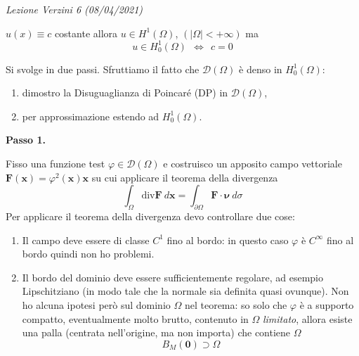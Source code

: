 \documentclass[10pt,a4paper,twoside,openright]{book}
\begin{document}
\textit{Lezione Verzini 6 (08/04/2021)}
\begin{oss}
	$\displaystyle u( x) \equiv c$ costante allora $\displaystyle u\in H^{1}( \Omega )$, $\displaystyle ( |\Omega |< +\infty )$ ma
	\begin{equation*}
		u\in H_{0}^{1}( \Omega ) \ \ \Leftrightarrow \ \ c=0
	\end{equation*}
\end{oss}
\begin{dimostrazione}
	Si svolge in due passi. Sfruttiamo il fatto che $\displaystyle \mathcal{D}( \Omega )$ è denso in $\displaystyle H_{0}^{1}( \Omega )$:
	\begin{enumerate}
		\item dimostro la Disuguaglianza di Poincaré (DP) in $\displaystyle \mathcal{D}( \Omega )$,
		\item per approssimazione estendo ad $\displaystyle H_{0}^{1}( \Omega )$.
	\end{enumerate}
	
	\textbf{Passo 1.}
	
	Fisso una funzione test $\displaystyle \varphi \in \mathcal{D}( \Omega )$ e costruisco un apposito campo vettoriale $\displaystyle \mathbf{F}(\mathbf{x}) =\varphi ^{2}(\mathbf{x})\mathbf{x}$ su cui applicare il teorema della divergenza
	\begin{equation*}
		\int _{\Omega }\mathrm{div}\mathbf{F} \ d\mathbf{x} =\int _{\partial \Omega }\mathbf{F} \cdotp \bm{\nu } \ d\sigma 
	\end{equation*}
	Per applicare il teorema della divergenza devo controllare due cose:
	\begin{enumerate}
		\item Il campo deve essere di classe $\displaystyle C^{1}$ fino al bordo: in questo caso $\displaystyle \varphi $ è $\displaystyle C^{\infty }$ fino al bordo quindi non ho problemi.
		\item Il bordo del dominio deve essere sufficientemente regolare, ad esempio Lipschitziano (in modo tale che la normale sia definita quasi ovunque). Non ho alcuna ipotesi però sul dominio $\displaystyle \Omega $ nel teorema: so solo che $\displaystyle \varphi $ è a supporto compatto, eventualmente molto brutto, contenuto in $\displaystyle \Omega $ \textit{limitato}, allora esiste una palla (centrata nell'origine, ma non importa) che contiene $\displaystyle \Omega $
		      \begin{equation*}
		      	B_{M}(\mathbf{0}) \supset \Omega 
		      \end{equation*}
		      

\end{enumerate}
\end{dimostrazione}
\end{document}
